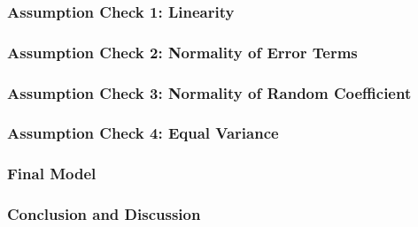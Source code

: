 \documentclass{beamer}
\begin{document}
\frame
{
\frametitle{Assumption Check 1: Linearity}


}

\frame
{
\frametitle{Assumption Check 2: Normality of Error Terms}


}

\frame
{
\frametitle{Assumption Check 3: Normality of Random Coefficient}


}

\frame
{
\frametitle{Assumption Check 4: Equal Variance}


}

\frame
{
\frametitle{Final Model}


}

\frame
{
\frametitle{Conclusion and Discussion}
}
\end{document}
